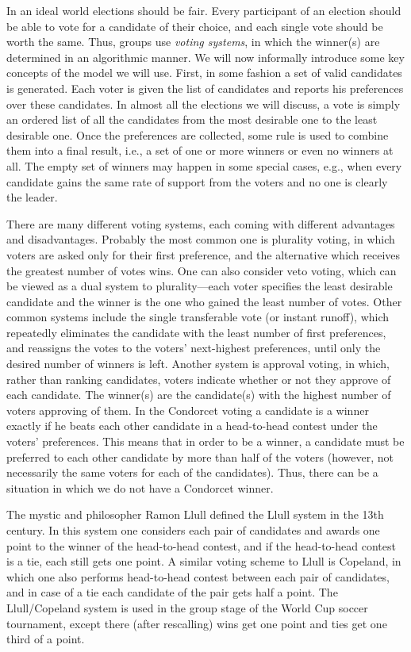 In an ideal world elections should be fair.
Every participant of an election should be able to vote for a candidate of their choice, and each single vote should be worth the same.
Thus, groups use \emph{voting systems}, in which the winner(s) are determined in an algorithmic manner.
We will now informally introduce some key concepts of the model we will use.
First, in some fashion a set of valid candidates is generated.
Each voter is given the list of candidates and reports his preferences over these candidates.
In almost all the elections we will discuss, a vote is simply an ordered list of all the candidates from the most desirable one to the least desirable one.
Once the preferences are collected, some rule is used to combine them into a final result, i.e., a set of one or more winners or even no winners at all.
The empty set of winners may happen in some special cases, e.g., when every candidate gains the same rate of support from the voters and no one is clearly the leader.

There are many different voting systems, each coming with different advantages and disadvantages.
Probably the most common one is plurality voting, in which voters are asked only for their first preference, and the alternative which receives the greatest number of votes wins.
One can also consider veto voting, which can be viewed as a dual system to plurality---each voter specifies the least desirable candidate and the winner is the one who gained the least number of votes.
Other common systems include the single transferable vote (or instant runoff), which repeatedly eliminates the candidate with the least number of first preferences, and reassigns the votes to the voters' next-highest preferences, until only the desired number of winners is left.
Another system is approval voting, in which, rather than ranking candidates, voters indicate whether or not they approve of each candidate.
The winner(s) are the candidate(s) with the highest number of voters approving of them.
In the Condorcet voting a candidate is a winner exactly if he beats each other candidate in a head-to-head contest under the voters' preferences.
This means that in order to be a winner, a candidate must be preferred to each other candidate by more than half of the voters (however, not necessarily the same voters for each of the candidates).
Thus, there can be a situation in which we do not have a Condorcet winner.

The mystic and philosopher Ramon Llull defined the Llull system in the 13th century.
In this system one considers each pair of candidates and awards one point to the winner of the head-to-head contest, and if the head-to-head contest is a tie, each still gets one point.
A similar voting scheme to Llull is Copeland, in which one also performs head-to-head contest between each pair of candidates, and in case of a tie each candidate of the pair gets half a point.
The Llull/Copeland system is used in the group stage of the World Cup soccer tournament, except there (after rescalling) wins get one point and ties get one third of a point.

